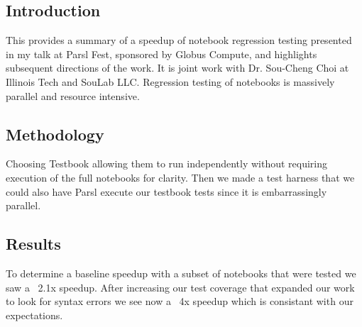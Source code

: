\subsection{Introduction}


 This provides a summary of a speedup of notebook regression testing presented in my talk at Parsl Fest, sponsored by Globus Compute, and highlights subsequent directions of the work. It is joint work with Dr. Sou-Cheng Choi at Illinois Tech and SouLab LLC. Regression testing of notebooks is massively parallel and resource intensive.

\subsection{Methodology}
 Choosing Testbook allowing them to run independently without requiring execution of the full notebooks for clarity. Then we made a test harness that we could also have Parsl execute our testbook tests since it is embarrassingly parallel.

\subsection{Results}
To determine a baseline speedup with a subset of notebooks that were tested we saw a ~2.1x speedup. After increasing our test coverage that expanded our work to look for syntax errors we see now a ~4x speedup which is consistant with our expectations. 


